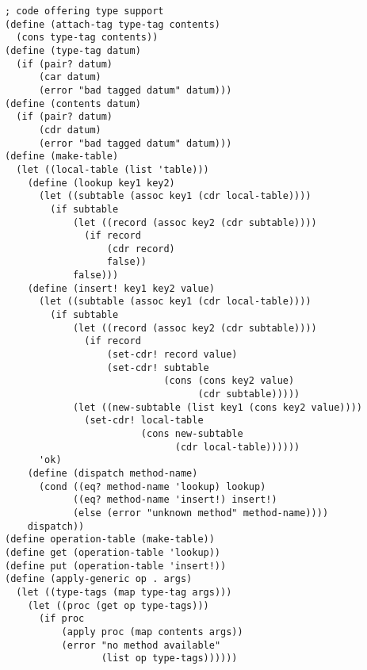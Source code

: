 \documentclass[../main.tex]{subfiles}
\begin{document}
\begin{lstlisting}
; code offering type support
(define (attach-tag type-tag contents)
  (cons type-tag contents))
(define (type-tag datum)
  (if (pair? datum)
      (car datum)
      (error "bad tagged datum" datum)))
(define (contents datum)
  (if (pair? datum)
      (cdr datum)
      (error "bad tagged datum" datum)))
(define (make-table)
  (let ((local-table (list 'table)))
    (define (lookup key1 key2)
      (let ((subtable (assoc key1 (cdr local-table))))
        (if subtable
            (let ((record (assoc key2 (cdr subtable))))
              (if record
                  (cdr record)
                  false))
            false)))
    (define (insert! key1 key2 value)
      (let ((subtable (assoc key1 (cdr local-table))))
        (if subtable
            (let ((record (assoc key2 (cdr subtable))))
              (if record
                  (set-cdr! record value)
                  (set-cdr! subtable
                            (cons (cons key2 value)
                                  (cdr subtable)))))
            (let ((new-subtable (list key1 (cons key2 value))))
              (set-cdr! local-table
                        (cons new-subtable
                              (cdr local-table))))))
      'ok)
    (define (dispatch method-name)
      (cond ((eq? method-name 'lookup) lookup)
            ((eq? method-name 'insert!) insert!)
            (else (error "unknown method" method-name))))
    dispatch))
(define operation-table (make-table))
(define get (operation-table 'lookup))
(define put (operation-table 'insert!))
(define (apply-generic op . args)
  (let ((type-tags (map type-tag args)))
    (let ((proc (get op type-tags)))
      (if proc
          (apply proc (map contents args))
          (error "no method available"
                 (list op type-tags))))))


\end{lstlisting}
\end{document}
